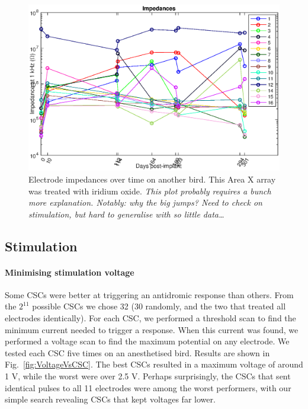 \documentclass[10pt,letterpaper]{article}
\newcommand\fig[1]{Fig.~\ref{#1}}
\renewcommand{\subsubsection}[1]{\paragraph{#1}}
\begin{document}
\begin{figure}
  \includegraphics[width=\textwidth]{Impedances-lw95rhp}
  \caption{Electrode impedances over time on another bird.  This Area X array was treated with iridium oxide.  {\em This plot probably requires a bunch more explanation.  Notably: why the big jumps?  Need to check on stimulation, but hard to generalise with so little data\dots}}
  \label{fig:Impedances-lw95rhp}
\end{figure}


\subsection{Stimulation}

\subsubsection{Minimising stimulation voltage}

Some CSCs were better at triggering an antidromic response than
others.  From the $2^{11}$ possible CSCs we chose 32 (30 randomly, and
the two that treated all electrodes identically).  For each CSC, we
performed a threshold scan to find the minimum current needed to
trigger a response.  When this current was found, we performed a
voltage scan to find the maximum potential on any electrode.  We
tested each CSC five times on an anesthetised bird.  Results are shown
in \fig{fig:VoltageVsCSC}.  The best CSCs resulted in a maximum
voltage of around 1 V, while the worst were over 2.5 V.  Perhaps
surprisingly, the CSCs that sent identical pulses to all 11 electrodes
were among the worst performers, with our simple search revealing CSCs
that kept voltages far lower.
\end{document}
